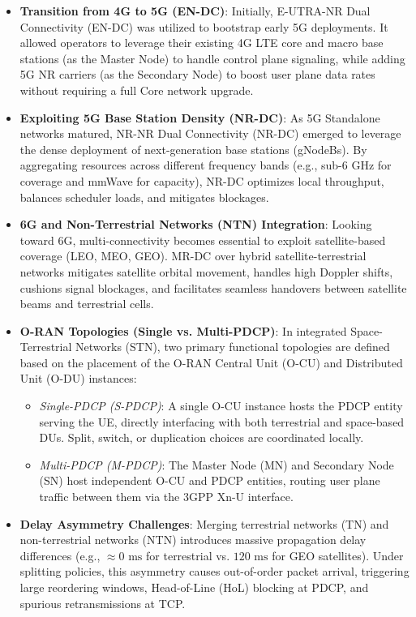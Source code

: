 \documentclass[conference]{IEEEtran}
\begin{document}
\begin{itemize}
    \item \textbf{Transition from 4G to 5G (EN-DC)}: Initially, E-UTRA-NR Dual Connectivity (EN-DC) was utilized to bootstrap early 5G deployments. It allowed operators to leverage their existing 4G LTE core and macro base stations (as the Master Node) to handle control plane signaling, while adding 5G NR carriers (as the Secondary Node) to boost user plane data rates without requiring a full Core network upgrade.
    \item \textbf{Exploiting 5G Base Station Density (NR-DC)}: As 5G Standalone networks matured, NR-NR Dual Connectivity (NR-DC) emerged to leverage the dense deployment of next-generation base stations (gNodeBs). By aggregating resources across different frequency bands (e.g., sub-6 GHz for coverage and mmWave for capacity), NR-DC optimizes local throughput, balances scheduler loads, and mitigates blockages.
    \item \textbf{6G and Non-Terrestrial Networks (NTN) Integration}: Looking toward 6G, multi-connectivity becomes essential to exploit satellite-based coverage (LEO, MEO, GEO). MR-DC over hybrid satellite-terrestrial networks mitigates satellite orbital movement, handles high Doppler shifts, cushions signal blockages, and facilitates seamless handovers between satellite beams and terrestrial cells.
    \item \textbf{O-RAN Topologies (Single vs. Multi-PDCP)}: In integrated Space-Terrestrial Networks (STN), two primary functional topologies are defined based on the placement of the O-RAN Central Unit (O-CU) and Distributed Unit (O-DU) instances:
    \begin{itemize}
        \item \textit{Single-PDCP (S-PDCP)}: A single O-CU instance hosts the PDCP entity serving the UE, directly interfacing with both terrestrial and space-based DUs. Split, switch, or duplication choices are coordinated locally.
        \item \textit{Multi-PDCP (M-PDCP)}: The Master Node (MN) and Secondary Node (SN) host independent O-CU and PDCP entities, routing user plane traffic between them via the 3GPP Xn-U interface.
    \end{itemize}
    \item \textbf{Delay Asymmetry Challenges}: Merging terrestrial networks (TN) and non-terrestrial networks (NTN) introduces massive propagation delay differences (e.g., $\approx 0\text{ ms}$ for terrestrial vs. $120\text{ ms}$ for GEO satellites). Under splitting policies, this asymmetry causes out-of-order packet arrival, triggering large reordering windows, Head-of-Line (HoL) blocking at PDCP, and spurious retransmissions at TCP.
\end{itemize}
\end{document}
